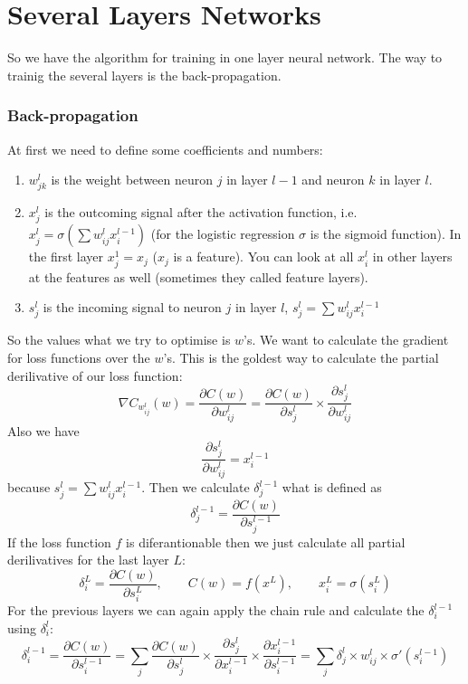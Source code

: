 \section{Several Layers Networks}

So we have the algorithm for training in one layer neural network. The way to trainig the several layers is the back-propagation. 

\subsubsection*{Back-propagation}

At first we need to define some coefficients and numbers:
\begin{enumerate}[label=$\bullet$]
  \item $w_{jk}^l$ is the weight between neuron $j$ in layer $l-1$ and neuron $k$ in layer $l$.
  \item $x_j^l$ is the outcoming signal after the activation function, i.e. $x_j^l=\sigma\left(\sum w_{ij}^lx_i^{l-1}\right)$ (for the logistic regression $\sigma$ is the sigmoid function). In the first layer $x_j^1=x_j$ ($x_j$ is a feature). You can look at all $x_i^l$ in other layers at the features as well (sometimes they called feature layers).
  \item $s_j^l$ is the incoming signal to neuron $j$ in layer $l$, $s_j^l=\sum w_{ij}^lx_i^{l-1}$
\end{enumerate}
So the values what we try to optimise is $w$'s. We want to calculate the gradient for loss functions over the $w$'s. This is the goldest way to calculate the partial derilivative of our loss function:
$$\nabla C_{w_{ij}^l}(w)=\frac{\partial C(w)}{\partial w_{ij}^l}=\frac{\partial C(w)}{\partial s_j^l}\times\frac{\partial s_j^l}{\partial w_{ij}^l}$$
Also we have
$$\frac{\partial s_j^l}{\partial w_{ij}^l}=x_i^{l-1}$$
because $s_j^l=\sum w_{ij}^lx_i^{l-1}$. Then we calculate $\delta_j^{l-1}$ what is defined as
$$\delta_j^{l-1}=\frac{\partial C(w)}{\partial s_j^{l-1}}$$
If the loss function $f$ is diferantionable then we just calculate all partial derilivatives for the last layer $L$:
$$\delta_i^L=\frac{\partial C(w)}{\partial s_i^L},\qquad C(w)=f(x^L),\qquad x_i^L=\sigma(s_i^L)$$
For the previous layers we can again apply the chain rule and calculate the $\delta_i^{l-1}$ using $\delta_i^l$:
$$\delta_i^{l-1}=\frac{\partial C(w)}{\partial s_i^{l-1}}=\sum\limits_{j}\frac{\partial C(w)}{\partial s_j^l}\times\frac{\partial s_j^l}{\partial x_i^{l-1}}\times\frac{\partial x_i^{l-1}}{\partial s_i^{l-1}}=\sum\limits_{j}\delta_j^l\times w_{ij}^l\times\sigma'(s_i^{l-1})$$

